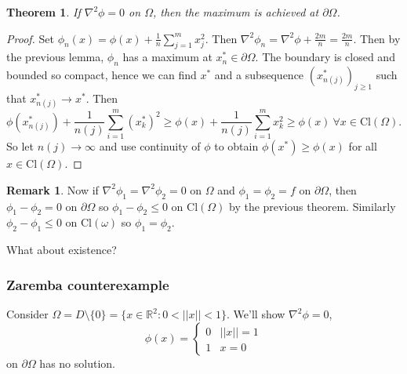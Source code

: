 \documentclass[a4paper, 10pt, twocolumn]{amsart}
\newtheorem*{theorem}{Theorem}
\theoremstyle{definition}
\newtheorem*{remark}{Remark}
\newcommand{\bb}[1]{\mathbb{#1}}
\newcommand{\Cl}[0]{\text{Cl}}
\newcommand{\1}{\mathbbm{1}}
\begin{document}
\begin{theorem}
    If $\nabla^2 \phi = 0$ on $\Omega$, then the maximum is achieved at $\partial \Omega$. 
\end{theorem}

\begin{proof}
    Set $\phi_n(x) = \phi(x) +\frac{1}{n} \sum_{j=1}^m x_j^2$. Then $\nabla^2 \phi_n = \nabla^2 \phi + \frac{2m}{n} = \frac{2m}{n}$. Then by the previous lemma, $\phi_n$ has a maximum at $x_n^\ast \in \partial \Omega$. The boundary is closed and bounded so compact, hence we can find $x^\ast$ and a subsequence $(x_{n(j)}^\ast)_{j\ge 1}$ such that $x_{n(j)}^\ast \to x^\ast$. Then \[\phi(x_{n(j)}^\ast)+\frac{1}{n(j)} \sum_{i=1}^m (x_k^\ast)^2 \ge \phi(x) + \frac{1}{n(j)} \sum_{i=1}^m x_k^2 \ge \phi(x) \ \forall x \in \Cl(\Omega).\]
    So let $n(j) \to \infty$ and use continuity of $\phi$ to obtain $\phi(x^\ast) \ge \phi(x)$ for all $x \in \Cl(\Omega)$.
\end{proof}

\begin{remark}
    Now if $\nabla^2 \phi_1 = \nabla^2 \phi_2 = 0$ on $\Omega$ and $\phi_1=\phi_2=f$ on $\partial \Omega$, then $\phi_1-\phi_2 = 0$ on $\partial \Omega$ so $\phi_1-\phi_2\le 0$ on $\Cl(\Omega)$ by the previous theorem. Similarly $\phi_2-\phi_1 \le 0$ on $\Cl(\omega)$ so $\phi_1=\phi_2$. 
\end{remark}





What about existence? 

\subsubsection*{Zaremba counterexample}

Consider $\Omega = D \setminus \{0\} = \{x \in \bb{R}^2 : 0<||x||<1\}$. We'll show $\nabla^2 \phi = 0$, \[\phi(x) = \begin{cases} 0 & ||x||=1\\ 1 & x=0\end{cases}\] on $\partial \Omega$ has no solution. \\
\end{document}
